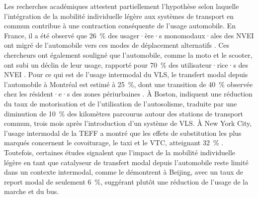 \begin{refsegment}
Les recherches académiques attestent partiellement l'hypothèse selon laquelle l'intégration de la mobilité individuelle légère aux systèmes de transport en commun contribue à une contraction conséquente de l'usage automobile. En France, il a été observé que 26~\% des usager·ère·s monomodaux·ales des \acrshort{NVEI} ont migré de l'automobile vers ces modes de déplacement alternatifs \textcolor{blue}{\autocite[14]{pages_nouveaux_2021}}. Ces chercheurs ont également souligné que l'automobile, comme la moto et le scooter, ont subi un déclin de leur usage, rapporté pour 70~\% des utilisateur·rice·s des \acrshort{NVEI} \textcolor{blue}{\autocite[13]{pages_nouveaux_2021}}. Pour ce qui est de l'usage intermodal du \acrshort{VLS}, le transfert modal depuis l'automobile à Montréal est estimé à 25~\%, dont une transition de 40~\% observée chez les résident·e·s des zones périurbaines \textcolor{blue}{\autocite[114]{bachand-marleau_much-anticipated_2011}}. À Boston, \textcolor{blue}{\textcite[14]{basu_planning_2021}} indiquent une réduction du taux de motorisation et de l'utilisation de l'autosolisme, traduite par une diminution de 10~\% des kilomètres parcourus autour des stations de transport commun, trois mois après l'introduction d'un système de \acrshort{VLS}. À New York City, l'usage intermodal de la \acrshort{TEFF} a montré que les effets de substitution les plus marqués concernent le covoiturage, le taxi et le \acrshort{VTC}, atteignant 32~\% \textcolor{blue}{\autocite[25]{lee_forecasting_2021}}. Toutefois, certaines études signalent que l'impact de la mobilité individuelle légère en tant que catalyseur de transfert modal depuis l'automobile reste limité dans un contexte intermodal, comme le démontrent \textcolor{blue}{\textcite[12]{fan_how_2019}} à Beijing, avec un taux de report modal de seulement 6~\%, suggérant plutôt une réduction de l'usage de la marche et du bus.%


\end{refsegment}
